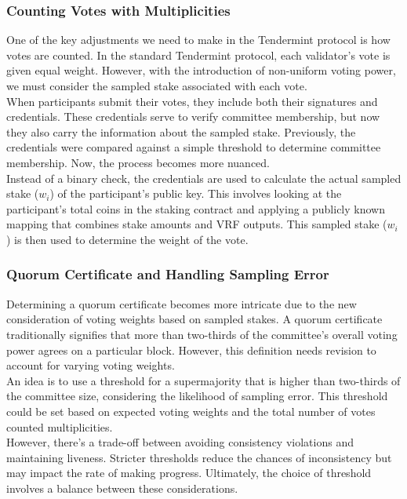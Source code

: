 \subsubsection{Counting Votes with Multiplicities}
One of the key adjustments we need to make in the Tendermint protocol is how votes are counted. In the standard Tendermint protocol, each validator's vote is given equal weight. However, with the introduction of non-uniform voting power, we must consider the sampled stake associated with each vote.\\
When participants submit their votes, they include both their signatures and credentials. These credentials serve to verify committee membership, but now they also carry the information about the sampled stake. Previously, the credentials were compared against a simple threshold to determine committee membership. Now, the process becomes more nuanced.\\
Instead of a binary check, the credentials are used to calculate the actual sampled stake ($w_i$) of the participant's public key. This involves looking at the participant's total coins in the staking contract and applying a publicly known mapping that combines stake amounts and VRF outputs. This sampled stake ($w_i$) is then used to determine the weight of the vote.

\subsubsection{Quorum Certificate and Handling Sampling Error}
Determining a quorum certificate becomes more intricate due to the new consideration of voting weights based on sampled stakes. A quorum certificate traditionally signifies that more than two-thirds of the committee's overall voting power agrees on a particular block. However, this definition needs revision to account for varying voting weights.\\
An idea is to use a threshold for a supermajority that is higher than two-thirds of the committee size, considering the likelihood of sampling error. This threshold could be set based on expected voting weights and the total number of votes counted multiplicities.\\
However, there's a trade-off between avoiding consistency violations and maintaining liveness. Stricter thresholds reduce the chances of inconsistency but may impact the rate of making progress. Ultimately, the choice of threshold involves a balance between these considerations.


